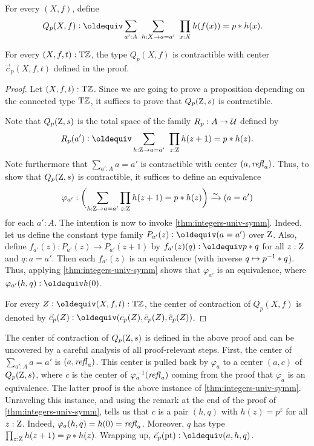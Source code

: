 \documentclass[a4,12pt]{amsart}
\begin{document}
\begin{definition}\label{def:guided-null-hmtps}
For every $(X,f)$, define
\begin{align*}\label{eq:TBD}
Q_p(X,f)&\defeq \sum_{a':A}~\sum_{h:X\to a=a'}~\prod_{x:X} h(f(x))=p\ct h(x).
\end{align*}
\end{definition}

\begin{lemma}\label{lem:guided-null-hmtps}
For every $(X,f,t):{\mathrm{T}\mathbb{Z}}$, the type $Q_p(X,f)$ is contractible
with center $\vec{c}_p(X,f,t)$ defined in the proof.
\end{lemma}
\begin{proof}
  Let $(X,f,t):{\mathrm{T}\mathbb{Z}}$. Since we are going to prove a proposition
  depending on the connected type ${\mathrm{T}\mathbb{Z}}$,
  it suffices to prove that $Q_p(\mathrm{Z},s)$ is contractible.

  Note that $Q_p(\mathrm{Z},s)$ is the total space of the family $R_p : A \to \mathcal{U}$ defined by
  \[
    R_p(a') \defeq \sum_{h:\zet \to a=a'}~\prod_{z:\zet} h(z+1)=p\ct h(z).
  \]
  Note furthermore that $\sum_{a':A} a=a'$ is contractible with center $(a,\mathop{{\it refl}_{a}})$.
  Thus, to show that $Q_p(\mathrm{Z},s)$ is contractible,
  it suffices to define an equivalence
  \[
    \varphi_{a'} : \biggl(\sum_{h:\mathrm{Z} \to a=a'}\prod_{z:\mathrm{Z}} h(z+1)=p* h(z)\biggr) \xrightarrow{\sim}{} (a=a')
  \]
  for each $a':A$.
  The intention is now to invoke \cref{thm:integers-univ-symm}.
  Indeed, let us define the constant type family $P_{a'}(z)\defeq(a=a')$
  over $\mathrm{Z}$. Also, define $f_{a'}(z) : P_{a'}(z) \to P_{a'}(z+1)$
  by $f_{a'}(z)(q) \defeq p \ct q$ for all $z:\mathrm{Z}$ and $q: a=a'$.
  Then each $f_{a'}(z)$ is an equivalence (with inverse $q \mapsto p^{-1}* q$).
  Thus, applying \cref{thm:integers-univ-symm}
  shows that $\varphi_{a'}$ is an equivalence,
  where $\varphi_{a'}(h,q) \defeq h(0)$.

For every $Z\defeq(X,f,t):\TorZ$, the center of contraction of $Q_p(X,f)$ 
is denoted by $\vec{c}_p(Z)\defeq(c_p(Z),\tilde{c}_p(Z),\hat{c}_p(Z))$.
\end{proof}

The center of contraction of $Q_p(\mathrm{Z},s)$ is defined in the above proof 
and can be uncovered by a careful analysis of all proof-relevant steps.
First, the center of $\sum_{a':A} a=a'$ is $(a,\mathop{{\it refl}_{a}})$.
This center is pulled back by $\varphi_{a}$ to a center
$(a,c)$ of $Q_p(\mathrm{Z},s)$, where $c$ is the center of 
$\varphi_{a}^{-1}(\mathop{{\it refl}_{a}})$ coming from the proof
that $\varphi_{a}$ is an equivalence. The latter proof
is the above instance of \cref{thm:integers-univ-symm}.
Unraveling this instance, and using the remark at the
end of the proof of \cref{thm:integers-univ-symm},
tells us that $c$ is a pair $(h,q)$ with $h(z)=p^z$
for all $z:\mathrm{Z}$. Indeed, $\varphi_{a}(h,q) = h(0) = \mathop{{\it refl}_{a}}$.
Moreover, $q$ has type $\prod_{z:\mathrm{Z}} h(z+1)=p* h(z)$.
Wrapping up, $\vec c_p(\pt)\defeq (a,h,q)$.
\end{document}
